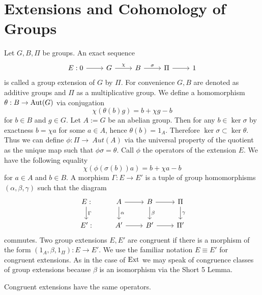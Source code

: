 \section{Extensions and Cohomology of Groups}
\label{s:extensionsandcohomologyofgroups}
Let $G, B, \Pi$ be groups.
An exact sequence 
\begin{equation} 
\label{diag:groupextension} 
\begin{tikzcd}
E: 0 \arrow{r}& G \arrow{r}{\chi} & B \arrow{r}{\sigma} &\Pi \arrow{r}& 1
\end{tikzcd}
\end{equation}
is called a group extension of $G$ by $\Pi$.
For convenience $G,B$ are denoted as additive groups and $\Pi$ as a multiplicative group.
We define a homomorphism 
$\theta:B \to \operatorname{Aut}(G)$ 
via conjugation
\[
\chi (\theta(b)g) = b + \chi g - b 
\]
for $b\in B$ and $g\in G$.
Let $A:=G$ be an abelian group.
Then for any $b\in \ker \sigma$ by exactness $b=\chi a$ for some $a\in A$, hence $\theta(b) = 1_{A}$.
Therefore $\ker \sigma \subset \ker \theta$.
Thus we can define
$\phi : \Pi \to \ Aut(A)$ via the universal property of the quotient as the unique map such that $\phi\sigma = \theta$.
Call $\phi$ the operators of the extension $E$.
We have the following equality
\begin{equation}
\label{eq:operatorsphi}
\chi (\phi(\sigma(b))a) = b + \chi a - b
\end{equation}
for $a\in A$ and $b\in B$.
A morphism $\Gamma: E \to E'$ is a tuple of group homomorphisms $(\alpha,\beta,\gamma)$ such that the diagram
\begin{equation*}
\begin{tikzcd}
E: \arrow{d}{\Gamma}&
A\arrow{r}\arrow{d}{\alpha}&
B \arrow{r}\arrow{d}{\beta}&
\Pi \arrow{d}{\gamma}
\\
E': &
A'\arrow{r} &
B'\arrow{r} &
\Pi'
\end{tikzcd}
\end{equation*}
commutes.
Two group extensions $E, E'$ are congruent if there is a morphism of the form $(1_A,\beta,1_{\Pi}):E \to E'$.
We use the familiar notation $E\equiv E'$ for congruent extensions.
As in the case of $\operatorname{Ext}^{}$ we may speak of congruence classes of group extensions because $\beta$ is an isomorphism via the Short 5 Lemma.
\begin{lemma}
Congruent extensions have the same operators.
\end{lemma}
